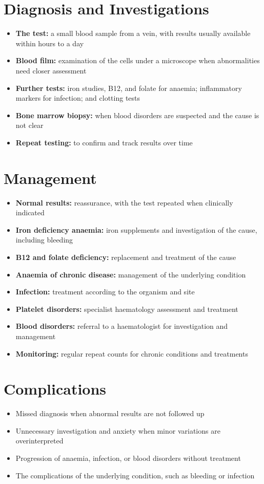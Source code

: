 \section*{Diagnosis and Investigations}
\begin{itemize}
    \item \textbf{The test:} a small blood sample from a vein, with results usually available within hours to a day
    \item \textbf{Blood film:} examination of the cells under a microscope when abnormalities need closer assessment
    \item \textbf{Further tests:} iron studies, B12, and folate for anaemia; inflammatory markers for infection; and clotting tests
    \item \textbf{Bone marrow biopsy:} when blood disorders are suspected and the cause is not clear
    \item \textbf{Repeat testing:} to confirm and track results over time
\end{itemize}

\section*{Management}
\begin{itemize}
    \item \textbf{Normal results:} reassurance, with the test repeated when clinically indicated
    \item \textbf{Iron deficiency anaemia:} iron supplements and investigation of the cause, including bleeding
    \item \textbf{B12 and folate deficiency:} replacement and treatment of the cause
    \item \textbf{Anaemia of chronic disease:} management of the underlying condition
    \item \textbf{Infection:} treatment according to the organism and site
    \item \textbf{Platelet disorders:} specialist haematology assessment and treatment
    \item \textbf{Blood disorders:} referral to a haematologist for investigation and management
    \item \textbf{Monitoring:} regular repeat counts for chronic conditions and treatments
\end{itemize}

\section*{Complications}
\begin{itemize}
    \item Missed diagnosis when abnormal results are not followed up
    \item Unnecessary investigation and anxiety when minor variations are overinterpreted
    \item Progression of anaemia, infection, or blood disorders without treatment
    \item The complications of the underlying condition, such as bleeding or infection
\end{itemize}

